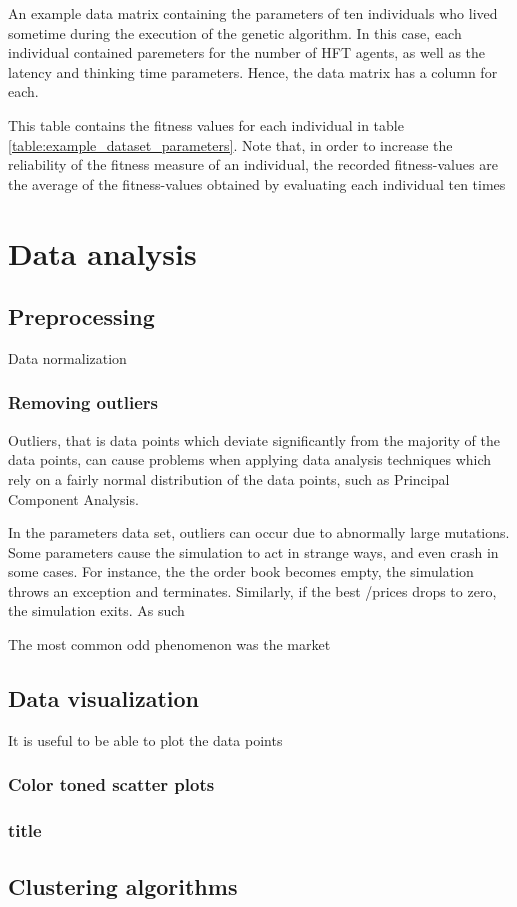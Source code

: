 \begin{table}
\centering
\scriptsize

\caption{An example data matrix containing the parameters of ten individuals who lived sometime during the execution of the genetic algorithm. In this case, each individual contained paremeters for the number of HFT agents, as well as the latency and thinking time parameters. Hence, the data matrix has a column for each.}
\label{table:example_dataset_parameters}
\end{table}

\begin{table}
\centering

\caption{This table contains the fitness values for each individual in table \ref{table:example_dataset_parameters}. Note that, in order to increase the reliability of the fitness measure of an individual, the recorded fitness-values are the average of the fitness-values obtained by evaluating each individual ten times}
\label{table:example_dataset_fitnesses}
\end{table}

\section{Data analysis}

\subsection{Preprocessing}
Data normalization

\subsubsection{Removing outliers}

Outliers, that is data points which deviate significantly from the majority of the data points, can cause problems when applying data analysis techniques which rely on a fairly normal distribution of the data points, such as Principal Component Analysis. 

In the parameters data set, outliers can occur due to abnormally large mutations. 
Some parameters cause the simulation to act in strange ways, and even crash in some cases. For instance, the the order book becomes empty, the simulation throws an exception and terminates. Similarly, if the best \bid/\ask prices drops to zero, the simulation exits. As such 

The most common odd phenomenon was the market 


\subsection{Data visualization}
It is useful to be able to plot the data points 
\subsubsection{Color toned scatter plots}
\subsubsection{title}
\subsection{Clustering algorithms}

